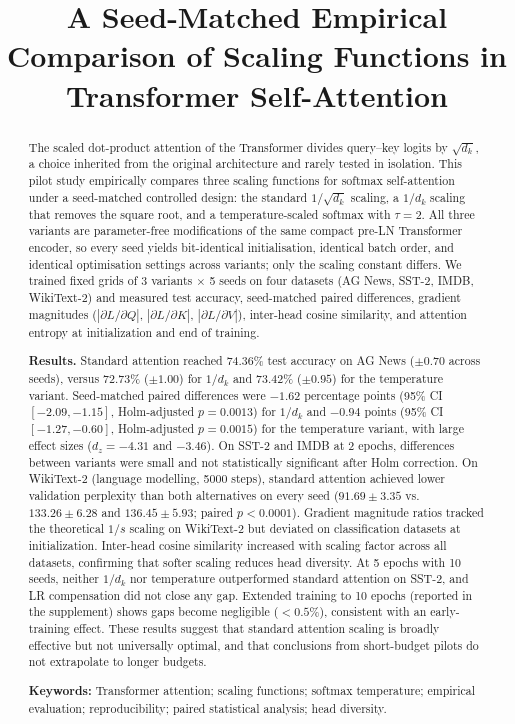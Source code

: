 \documentclass[10pt,a4paper]{article}
\title{\textbf{A Seed-Matched Empirical Comparison of Scaling Functions in Transformer Self-Attention}}
\author{}
\date{}
\begin{document}
\maketitle

\begin{abstract}
\noindent The scaled dot-product attention of the Transformer divides query--key logits by $\sqrt{d_k}$, a choice inherited from the original architecture and rarely tested in isolation. This pilot study empirically compares three scaling functions for softmax self-attention under a seed-matched controlled design: the standard $1/\sqrt{d_k}$ scaling, a $1/d_k$ scaling that removes the square root, and a temperature-scaled softmax with $\tau = 2$. All three variants are parameter-free modifications of the same compact pre-LN Transformer encoder, so every seed yields bit-identical initialisation, identical batch order, and identical optimisation settings across variants; only the scaling constant differs. We trained fixed grids of 3 variants $\times$ 5 seeds on four datasets (AG News, SST-2, IMDB, WikiText-2) and measured test accuracy, seed-matched paired differences, gradient magnitudes ($|\partial L/\partial Q|$, $|\partial L/\partial K|$, $|\partial L/\partial V|$), inter-head cosine similarity, and attention entropy at initialization and end of training.

\noindent\textbf{Results.} Standard attention reached 74.36\% test accuracy on AG News ($\pm 0.70$ across seeds), versus 72.73\% ($\pm 1.00$) for $1/d_k$ and 73.42\% ($\pm 0.95$) for the temperature variant. Seed-matched paired differences were $-1.62$ percentage points (95\% CI $[-2.09,-1.15]$, Holm-adjusted $p=0.0013$) for $1/d_k$ and $-0.94$ points (95\% CI $[-1.27,-0.60]$, Holm-adjusted $p=0.0015$) for the temperature variant, with large effect sizes ($d_z=-4.31$ and $-3.46$). On SST-2 and IMDB at 2 epochs, differences between variants were small and not statistically significant after Holm correction. On WikiText-2 (language modelling, 5000 steps), standard attention achieved lower validation perplexity than both alternatives on every seed ($91.69 \pm 3.35$ vs. $133.26 \pm 6.28$ and $136.45 \pm 5.93$; paired $p < 0.0001$). Gradient magnitude ratios tracked the theoretical $1/s$ scaling on WikiText-2 but deviated on classification datasets at initialization. Inter-head cosine similarity increased with scaling factor across all datasets, confirming that softer scaling reduces head diversity. At 5 epochs with 10 seeds, neither $1/d_k$ nor temperature outperformed standard attention on SST-2, and LR compensation did not close any gap. Extended training to 10 epochs (reported in the supplement) shows gaps become negligible ($<0.5\%$), consistent with an early-training effect. These results suggest that standard attention scaling is broadly effective but not universally optimal, and that conclusions from short-budget pilots do not extrapolate to longer budgets.

\vspace{0.5em}
\noindent\textbf{Keywords:} Transformer attention; scaling functions; softmax temperature; empirical evaluation; reproducibility; paired statistical analysis; head diversity.
\end{abstract}
\end{document}
